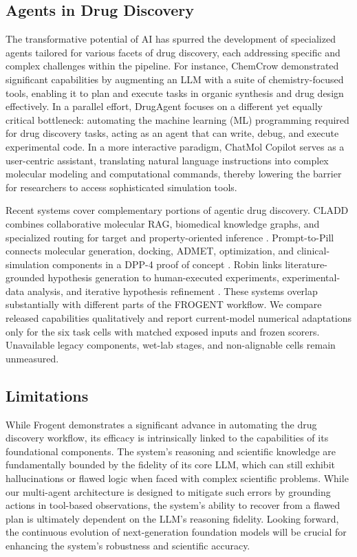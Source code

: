 \documentclass{article}
\newcommand{\name}{Frogent }
\begin{document}
\subsection*{Agents in Drug Discovery}
The transformative potential of AI has spurred the development of specialized agents tailored for various facets of drug discovery, each addressing specific and complex challenges within the pipeline. For instance, ChemCrow \cite{bran2023chemcrow} demonstrated significant capabilities by augmenting an LLM with a suite of chemistry-focused tools, enabling it to plan and execute tasks in organic synthesis and drug design effectively. In a parallel effort, DrugAgent \cite{liu2024drugagent} focuses on a different yet equally critical bottleneck: automating the machine learning (ML) programming required for drug discovery tasks, acting as an agent that can write, debug, and execute experimental code. In a more interactive paradigm, ChatMol Copilot \cite{sun2024chatmol} serves as a user-centric assistant, translating natural language instructions into complex molecular modeling and computational commands, thereby lowering the barrier for researchers to access sophisticated simulation tools.

Recent systems cover complementary portions of agentic drug discovery. CLADD combines collaborative molecular RAG, biomedical knowledge graphs, and specialized routing for target and property-oriented inference \cite{lee2025rag}. Prompt-to-Pill connects molecular generation, docking, ADMET, optimization, and clinical-simulation components in a DPP-4 proof of concept \cite{vichentijevikj2026prompt}. Robin links literature-grounded hypothesis generation to human-executed experiments, experimental-data analysis, and iterative hypothesis refinement \cite{ghareeb2026robin}. These systems overlap substantially with different parts of the FROGENT workflow. We compare released capabilities qualitatively and report current-model numerical adaptations only for the six task cells with matched exposed inputs and frozen scorers. Unavailable legacy components, wet-lab stages, and non-alignable cells remain unmeasured.

\subsection*{Limitations}
While \name demonstrates a significant advance in automating the drug discovery workflow, its efficacy is intrinsically linked to the capabilities of its foundational components. The system's reasoning and scientific knowledge are fundamentally bounded by the fidelity of its core LLM, which can still exhibit hallucinations or flawed logic when faced with complex scientific problems. While our multi-agent architecture is designed to mitigate such errors by grounding actions in tool-based observations, the system's ability to recover from a flawed plan is ultimately dependent on the LLM's reasoning fidelity. Looking forward, the continuous evolution of next-generation foundation models will be crucial for enhancing the system's robustness and scientific accuracy.
\end{document}
